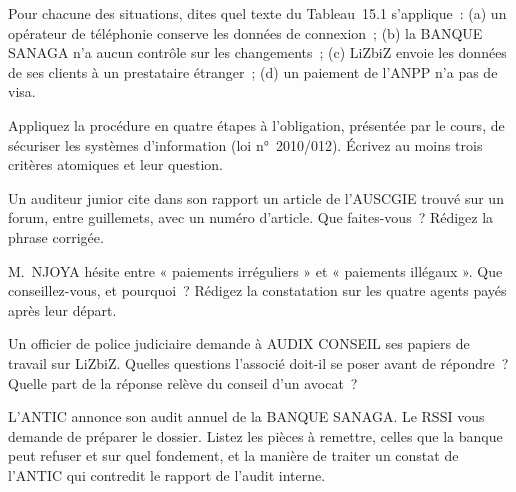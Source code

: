 \bigskip

\begin{boxexo}[title={\ding{45}\quad Exercice~15.4. Quel texte~? \niveaubase}]
Pour chacune des situations, dites quel texte du Tableau~15.1 s'applique~:
(a) un opérateur de téléphonie conserve les données de connexion~; (b) la
BANQUE SANAGA n'a aucun contrôle sur les changements~; (c) LiZbiZ envoie
les données de ses clients à un prestataire étranger~; (d) un paiement de
l'ANPP n'a pas de visa.
\end{boxexo}

\begin{boxexo}[title={\ding{45}\quad Exercice~15.5. Du texte au critère \niveaumoyen}]
Appliquez la procédure en quatre étapes à l'obligation, présentée par le
cours, de sécuriser les systèmes d'information (loi n°~2010/012). Écrivez
au moins trois critères atomiques et leur question.
\end{boxexo}

\begin{boxexo}[title={\ding{45}\quad Exercice~15.6. Citer « à vérifier » \niveaumoyen}]
Un auditeur junior cite dans son rapport un article de l'AUSCGIE trouvé sur
un forum, entre guillemets, avec un numéro d'article. Que faites-vous~?
Rédigez la phrase corrigée.
\end{boxexo}

\begin{boxexo}[title={\ding{45}\quad Exercice~15.7. Irrégulier ou illégal~? \niveaumoyen}]
M.~NJOYA hésite entre « paiements irréguliers » et « paiements illégaux ».
Que conseillez-vous, et pourquoi~? Rédigez la constatation sur les quatre
agents payés après leur départ.
\end{boxexo}

\begin{boxexo}[title={\ding{45}\quad Exercice~15.8. Le secret et la réquisition \niveaumoyen}]
Un officier de police judiciaire demande à AUDIX CONSEIL ses papiers de
travail sur LiZbiZ. Quelles questions l'associé doit-il se poser avant de
répondre~? Quelle part de la réponse relève du conseil d'un avocat~?
\end{boxexo}

\begin{boxexo}[title={\ding{45}\quad Exercice~15.9. Un audit ANTIC \niveauexpert}]
L'ANTIC annonce son audit annuel de la BANQUE SANAGA. Le RSSI vous demande
de préparer le dossier. Listez les pièces à remettre, celles que la
banque peut refuser et sur quel fondement, et la manière de traiter un
constat de l'ANTIC qui contredit le rapport de l'audit interne.
\end{boxexo}

